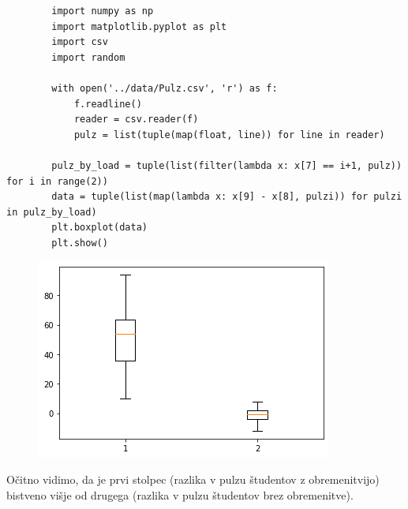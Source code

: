 \documentclass[a4paper]{article}
\begin{document}
\begin{homeworkProblem}
    \solution
    \begin{verbatim}
        import numpy as np
        import matplotlib.pyplot as plt
        import csv
        import random

        with open('../data/Pulz.csv', 'r') as f:
            f.readline()
            reader = csv.reader(f)
            pulz = list(tuple(map(float, line)) for line in reader)

        pulz_by_load = tuple(list(filter(lambda x: x[7] == i+1, pulz)) for i in range(2))
        data = tuple(list(map(lambda x: x[9] - x[8], pulzi)) for pulzi in pulz_by_load)
        plt.boxplot(data)
        plt.show()
    \end{verbatim}
    \begin{figure}[h!]
        \includegraphics{fig-3-1.png}
    \end{figure}
    Očitno vidimo, da je prvi stolpec (razlika v pulzu študentov z obremenitvijo) bistveno višje od drugega (razlika v pulzu študentov brez obremenitve).


\end{homeworkProblem}
\end{document}
